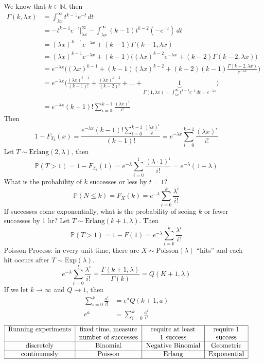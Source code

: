 \documentclass[12pt]{article}
\newcommand{\prob}[1]{\mathbb{P}(#1)}
\begin{document}
We know that $k \in \mathbb{N}$, then $$\begin{aligned} \Gamma(k, \lambda x) &= \int_{kx}^{\infty} t^{k - 1} e^{-t} \, dt \\ &= -t^{k - 1} e^{-t} \Big|_{\lambda x}^{\infty} - \int_{\lambda x}^{\infty} (k - 1)t^{k - 2} (-e^{-t}) \, dt \\ &= (\lambda x)^{k - 1} e^{-\lambda x} + (k - 1) \Gamma(k - 1, \lambda x) \\ &= (\lambda x)^{k - 1} e^{-\lambda x} + (k - 1)\Big( (\lambda x)^{k - 2} e^{-\lambda x} + (k - 2) \Gamma(k -2, \lambda x) \Big) \\ &= e^{-\lambda x} \Big( (\lambda x)^{k - 1} + (k - 1)(\lambda x)^{k - 2} + (k - 2)(k - 1) \frac{\Gamma(k - 2, \lambda x)}{e^{-\lambda x}}\Big) \\ &= e^{-\lambda x} \Big( \frac{(\lambda x)^{k - 1}}{(k - 1)!} + \frac{(\lambda x)^{k - 2}}{(k - 2)!} + \dots + \underbrace{1}_{\Gamma(1, \lambda x) = \int_{\lambda x}^{\infty} t^{1-1} e^{-t} \, dt = e^{-\lambda x}}\Big) \\ &= e^{-\lambda x} (k - 1)! \sum_{i = 0}^{k - 1} \frac{(\lambda x)^i}{i!} \end{aligned} $$ Then
$$1 - F_{T_k}(x) = \frac{e^{-\lambda x} (k - 1)! \sum_{i = 0}^{k - 1} \frac{(\lambda x)^i}{i!}}{(k - 1)!} = e^{-\lambda x} \sum_{i = 0}^{k - 1} \frac{(\lambda x)^i}{i!} $$ 
Let $T \sim \text{Erlang}(2, \lambda)$, then 
$$\prob{T > 1} = 1 - F_{T_2}(1) = e^{-\lambda} \sum_{i = 0}^1 \frac{(\lambda \cdot 1)^i}{i!} = e^{-\lambda} (1 + \lambda) $$ 
What is the probability of $k$ successes or less by $t = 1$? 
$$\prob{N \leq k} = F_X(k) = e^{-\lambda} \sum_{i = 0}^k \frac{\lambda^i}{i!} $$ If successes come exponentially, what is the probability of seeing $k$ or fewer successes by 1 hr? Let $T \sim \text{Erlang}(k + 1, \lambda)$. Then $$\prob{T > 1} = 1 - F(1) = e^{-\lambda} \sum_{i = 0}^k \frac{\lambda^i}{i!}$$ 
Poisson Process: in every unit time, there are $X \sim \text{Poisson}(\lambda)$ ``hits'' and each hit occurs after $T \sim \text{Exp}(\lambda)$. 
$$ e^{-\lambda} \sum_{i = 0}^l \frac{\lambda^i}{i!} = \frac{\Gamma(k + 1, \lambda)}{\Gamma(k)} = Q(K + 1, \lambda) $$ If we let $k \to \infty$ and $Q \to 1$, then $$\begin{aligned} \sum_{i = 0}^k \frac{a^i}{i!} &= e^aQ(k + 1, a) \\ e^a &= \sum_{i = 0}^k \frac{a^i}{i!} \end{aligned} $$
$$\begin{tabular}{|c|c|c|c|} \hline Running experiments & fixed time, measure & require at least  & require 1  \\
&  number of successes & 1 success & success \\ \hline
 discretely & Binomial & Negative Binomial & Geometric \\ \hline continuously & Poisson & Erlang & Exponential \\ \hline \end{tabular} $$ 
\end{document}
